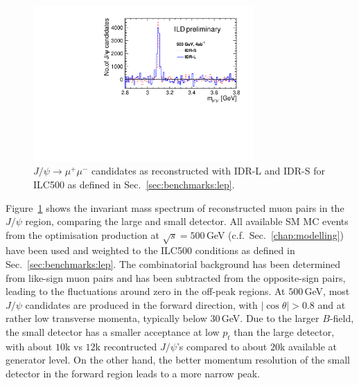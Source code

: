 \begin{figure}[htbp]
\begin{center}
 \includegraphics[width=0.75\textwidth]{Performance/fig/JPsi_InvMassS5_vs_L5.pdf}
\end{center}
\caption{$J/\psi \to \mu^+\mu^-$ candidates as reconstructed with IDR-L and IDR-S for ILC500 as defined in Sec.~\ref{sec:benchmarks:lep}.}
\label{fig:hlr:jpsi}
\end{figure}

Figure~\ref{fig:hlr:jpsi} shows the invariant mass spectrum of reconstructed muon pairs in the $J/\psi$ region, comparing the large and small detector. All available
SM MC events from the optimisation production at $\sqrt{s}=500$\,GeV (c.f.\ Sec.~\ref{chap:modelling}) have been used and weighted to the ILC500 conditions as defined in Sec.~\ref{sec:benchmarks:lep}. The combinatorial background has been determined from like-sign muon pairs and has been subtracted from the opposite-sign pairs, leading to the fluctuations around zero in the off-peak regions.
At $500$\,GeV, most $J/\psi$ candidates are produced in the forward direction, with $|\cos{\theta}|>0.8$ and at rather low transverse momenta, typically below $30$\,GeV.
Due to the larger $B$-field, the small detector has a smaller acceptance at low $p_t$ than the large detector, with about $10$k vs $12$k recontructed $J/\psi$'s compared to about $20$k available at generator level. On the other hand, the better momentum resolution of the small detector in the forward region leads to a more narrow peak.



